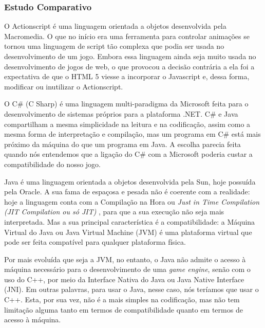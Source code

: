 \subsubsection{Estudo Comparativo}
%
O Actionscript é uma linguagem orientada a objetos desenvolvida pela Macromedia. O que no início era uma ferramenta para controlar animações 
se tornou uma linguagem de script tão complexa que podia ser usada no desenvolvimento de um jogo. Embora essa linguagem ainda seja muito usada 
no desenvolvimento de jogos de web, o que provocou a decisão contrária a ela foi a expectativa de que o HTML 5 viesse a incorporar o Javascript e, 
dessa forma, modificar ou inutilizar o Actionscript.
\par
O C\# (C Sharp) é uma linguagem multi-paradigma da Microsoft feita para o desenvolvimento de sistemas próprios para a plataforma .NET. C\# e Java 
compartilham a mesma simplicidade na leitura e na codificação, assim como a mesma forma de interpretação e compilação, mas um programa em C\# está 
mais próximo da máquina do que um programa em Java. A escolha parecia feita quando nós entendemos que a ligação do C\# com a Microsoft poderia 
custar a compatibilidade do nosso jogo.
\par
Java é uma linguagem orientada a objetos desenvolvida pela Sun, hoje possuída pela Oracle. A sua fama de espaçosa e pesada não é coerente com a 
realidade: hoje a linguagem conta com a Compilação na Hora ou \textit{Just in Time Compilation (JIT Compilation ou só JIT)} , 
para que a sua execução não seja mais interpretada. Mas a sua principal característica é a compatibilidade: a Máquina Virtual do Java ou Java Virtual Machine (JVM) é uma plataforma virtual que pode ser feita compatível para qualquer plataforma física.
\par
Por mais evoluída que seja a JVM, no entanto, o Java não admite o acesso à máquina necessário para o desenvolvimento de uma \textit{game engine}, 
senão com o uso do C++, por meio da Interface Nativa do Java ou Java Native Interface (JNI). Em outras palavras, para usar o Java, nesse caso, 
nós teríamos que usar o C++. Esta, por sua vez, não é a mais simples na codificação, mas não tem limitação alguma tanto em termos de 
compatibilidade quanto em termos de acesso à máquina.
%

